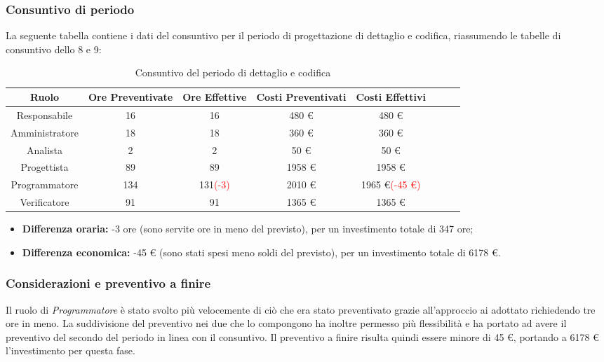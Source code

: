 \subsubsection{Consuntivo di periodo}

La seguente tabella contiene i dati del consuntivo per il periodo di progettazione di dettaglio e codifica, riassumendo le tabelle di consuntivo dello  8 e 9:
\begin{table}[H]
		\begin{center}
			\setlength{\aboverulesep}{0pt}
			\setlength{\belowrulesep}{0pt}
			\setlength{\extrarowheight}{.75ex}
			\begin{tabular}{ c c c c c c c c }
				\rowcolor{AzzurroGruppo!30} 
				\textbf{Ruolo} & \textbf{Ore Preventivate} & \textbf{Ore Effettive} & \textbf{Costi Preventivati} & \textbf{Costi Effettivi}\\
				\toprule
				Responsabile   & 16 & 16 & 480 \euro{}  & 480 \euro{}\\
				Amministratore & 18 & 18 & 360 \euro{}  & 360 \euro{} \\
				Analista       & 2 & 2 & 50 \euro{}  & 50 \euro{} \\
				Progettista    & 89 & 89 & 1958 \euro{} & 1958 \euro{} \\
				Programmatore  & 134 & 131\textcolor{red} {(-3)} & 2010 \euro{}  & 1965 \euro{}\textcolor{red}{(-45 \euro{})} \\
				Verificatore   & 91 & 91 & 1365 \euro{}  & 1365 \euro{} \\
				\bottomrule
			\end{tabular}
			\caption{Consuntivo del periodo di dettaglio e codifica}
		\end{center}
	\end{table}
	
\begin{itemize}
	\item \textbf{Differenza oraria:} -3 ore (sono servite ore in meno del previsto), per un investimento totale di 347 ore;
	\item \textbf{Differenza economica:} -45 \euro{} (sono stati spesi meno soldi del previsto), per un investimento totale di 6178 \euro{}.
\end{itemize}

\subsubsection{Considerazioni e preventivo a finire}
Il ruolo di \textit{Programmatore} è stato svolto più velocemente di ciò che era stato preventivato grazie all'approccio ai  adottato richiedendo tre ore in meno. La suddivisione del preventivo nei due  che lo compongono ha inoltre permesso più flessibilità e ha portato ad avere il preventivo del secondo  del periodo in linea con il consuntivo. \newline{}
Il preventivo a finire risulta quindi essere minore di 45 \euro{}, portando a 6178 \euro{} l'investimento per questa fase.

